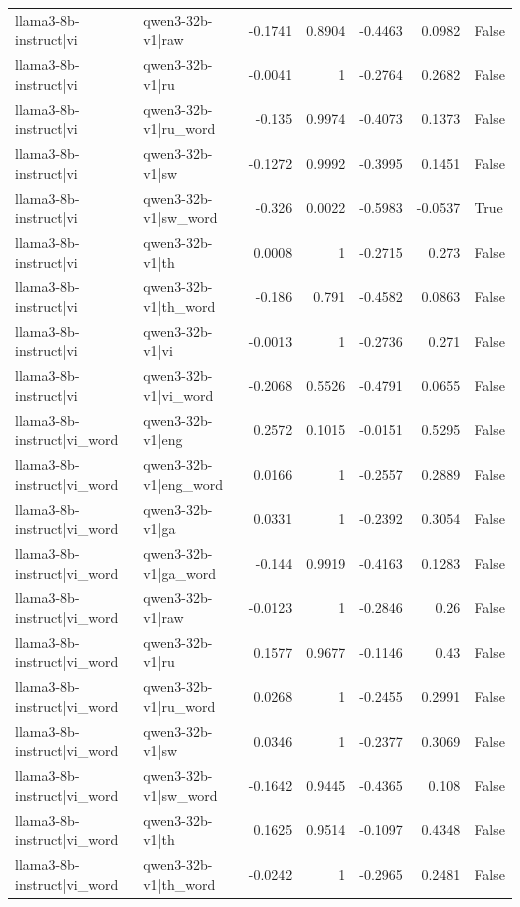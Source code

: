 \begin{table}
\begin{tabular}{l l r r r r l}
llama3-8b-instruct|vi & qwen3-32b-v1|raw & -0.1741 & 0.8904 & -0.4463 & 0.0982 & False \\
llama3-8b-instruct|vi & qwen3-32b-v1|ru & -0.0041 & 1 & -0.2764 & 0.2682 & False \\
llama3-8b-instruct|vi & qwen3-32b-v1|ru_word & -0.135 & 0.9974 & -0.4073 & 0.1373 & False \\
llama3-8b-instruct|vi & qwen3-32b-v1|sw & -0.1272 & 0.9992 & -0.3995 & 0.1451 & False \\
llama3-8b-instruct|vi & qwen3-32b-v1|sw_word & -0.326 & 0.0022 & -0.5983 & -0.0537 & True \\
llama3-8b-instruct|vi & qwen3-32b-v1|th & 0.0008 & 1 & -0.2715 & 0.273 & False \\
llama3-8b-instruct|vi & qwen3-32b-v1|th_word & -0.186 & 0.791 & -0.4582 & 0.0863 & False \\
llama3-8b-instruct|vi & qwen3-32b-v1|vi & -0.0013 & 1 & -0.2736 & 0.271 & False \\
llama3-8b-instruct|vi & qwen3-32b-v1|vi_word & -0.2068 & 0.5526 & -0.4791 & 0.0655 & False \\
llama3-8b-instruct|vi_word & qwen3-32b-v1|eng & 0.2572 & 0.1015 & -0.0151 & 0.5295 & False \\
llama3-8b-instruct|vi_word & qwen3-32b-v1|eng_word & 0.0166 & 1 & -0.2557 & 0.2889 & False \\
llama3-8b-instruct|vi_word & qwen3-32b-v1|ga & 0.0331 & 1 & -0.2392 & 0.3054 & False \\
llama3-8b-instruct|vi_word & qwen3-32b-v1|ga_word & -0.144 & 0.9919 & -0.4163 & 0.1283 & False \\
llama3-8b-instruct|vi_word & qwen3-32b-v1|raw & -0.0123 & 1 & -0.2846 & 0.26 & False \\
llama3-8b-instruct|vi_word & qwen3-32b-v1|ru & 0.1577 & 0.9677 & -0.1146 & 0.43 & False \\
llama3-8b-instruct|vi_word & qwen3-32b-v1|ru_word & 0.0268 & 1 & -0.2455 & 0.2991 & False \\
llama3-8b-instruct|vi_word & qwen3-32b-v1|sw & 0.0346 & 1 & -0.2377 & 0.3069 & False \\
llama3-8b-instruct|vi_word & qwen3-32b-v1|sw_word & -0.1642 & 0.9445 & -0.4365 & 0.108 & False \\
llama3-8b-instruct|vi_word & qwen3-32b-v1|th & 0.1625 & 0.9514 & -0.1097 & 0.4348 & False \\
llama3-8b-instruct|vi_word & qwen3-32b-v1|th_word & -0.0242 & 1 & -0.2965 & 0.2481 & False \\

\end{tabular}
\end{table}
